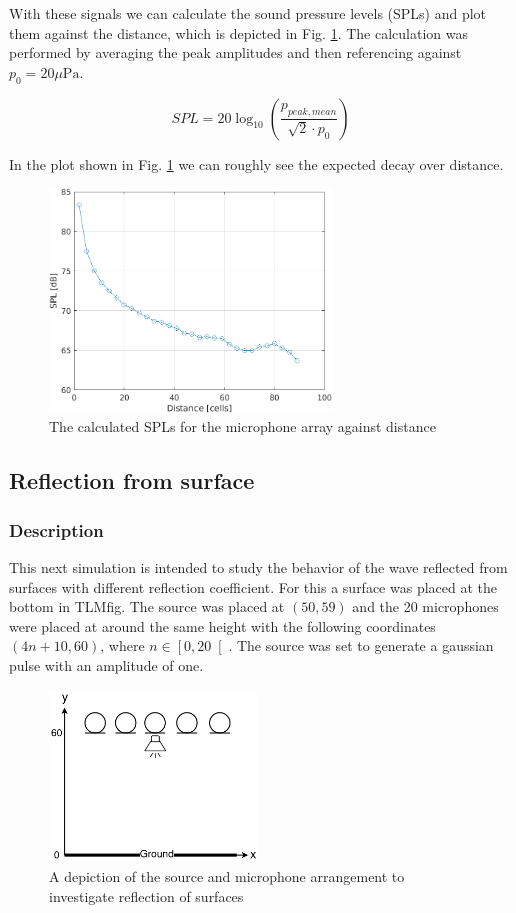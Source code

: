 \documentclass[twocolumn]{article}
\begin{document}
With these signals we can calculate the sound pressure levels (SPLs) and plot
them against the distance, which is depicted in Fig. \ref{fig_3_1_spl}.
The calculation was performed by averaging the peak amplitudes and then
referencing against $p_0 = 20\mu\text{Pa}$.

\begin{equation}
    SPL = 20\log_{10}\left(\frac{p_{peak,mean}}{\sqrt{2}\cdot p_{0}}\right)
\end{equation}

In the plot shown in Fig. \ref{fig_3_1_spl} we can roughly see the expected
decay over distance.

\begin{figure}[H]
    \centering
    \includegraphics[width=75mm]{./Images/3_1_spls.png}
    \caption{The calculated SPLs for the microphone array against distance}
    \label{fig_3_1_spl}
\end{figure}

\subsection{Reflection from surface}
\subsubsection{Description}
This next simulation is intended to study the behavior of the wave reflected from
surfaces with different reflection coefficient.
For this a surface was placed at the bottom in TLMfig.
The source was placed at $\left(50,59\right)$ and the 20 microphones were
placed at around the same height with the following coordinates
$\left(4n+10,60\right)$, where $n\in\left[0,20\right[$.
The source was set to generate a gaussian pulse with an amplitude of one.

\begin{figure}[H]
    \centering
    \includegraphics[width=55mm]{./Images/tlmfig_3_2.png}
    \caption{A depiction of the source and microphone arrangement to investigate reflection of surfaces}
    \label{fig_3_2_example}
\end{figure}
\end{document}
